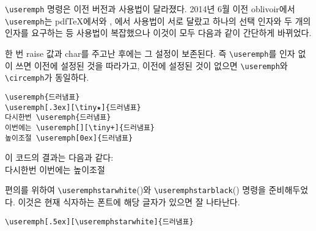 \documentclass[
	12pt,
	a4paper,
	kosection,
	footnote,
	nobookmarks,
	microtype,
]{oblivoir}
\def\cs#1{\texttt{\textbackslash #1}}
\newcommand\xobclass{x\-ob\-liv\-oir\oblivoirallowbreak}
\newcommand\obclass{ob\-liv\-oir\oblivoirallowbreak}
\def\xetexko{\XeTeX-\ko}
\begin{document}
\medskip

\cs{useremph} 명령은 이전 버전과 사용법이 달라졌다. 2014년 6월 이전 oblivoir에서
\cs{useremph}는 pdf\TeX 에서와 \XeTeX, \LuaTeX 에서 사용법이 서로 달랐고 
하나의 선택 인자와 두 개의 인자를 요구하는 등 사용법이 복잡했으나 이것이 모두 다음과 같이
간단하게 바뀌었다.
\begin{boxedverbatim}
\end{boxedverbatim}
한 번 raise 값과 char를 주고난 후에는 그 설정이 보존된다. 즉 \cs{useremph}를
인자 없이 쓰면 이전에 설정된 것을 따라가고, 이전에 설정된 것이 없으면 \cs{useremph}와
\cs{circemph}가 동일하다.

\begin{verbatim}
\useremph{드러냄표}
\useremph[.3ex][\tiny★]{드러냄표}
다시한번 \useremph{드러냄표}
이번에는 \useremph[][\tiny+]{드러냄표}
높이조절 \useremph[0ex]{드러냄표}
\end{verbatim}

이 코드의 결과는 다음과 같다:\\
 다시한번 
이번에는 
높이조절 

\medskip

편의를 위하여 \cs{useremphstarwhite}({\useremphstarwhite})와 \cs{useremphstarblack}({\useremphstarblack})
명령을 준비해두었다. 이것은 현재 식자하는 폰트에 해당 글자가 있으면 잘 나타난다.

\medskip

\noindent\begin{minipage}{.7\textwidth}
\begin{verbatim}
\useremph[.5ex][\useremphstarwhite]{드러냄표}
\end{verbatim}
\end{minipage}\hfill
\begin{minipage}{.28\textwidth}
\end{minipage}

\end{document}
